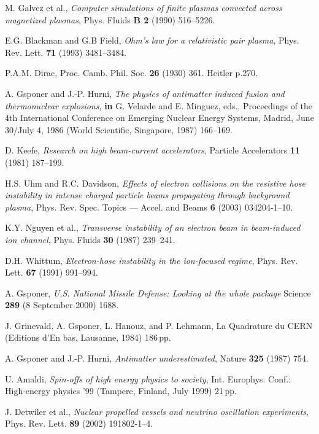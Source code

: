 \documentclass [12pt,a4paper,     ]{report} %
\begin{document}
\begin{enumerate}
 M. Galvez et al.,  \emph{Computer simulations of finite plasmas convected across magnetized plasmas}, Phys. Fluids {\bf B 2} (1990) 516--5226.

 E.G. Blackman and G.B Field, \emph{Ohm's law for a relativistic pair plasma}, Phys. Rev. Lett. {\bf 71} (1993) 3481--3484.

 P.A.M. Dirac, Proc. Camb. Phil. Soc. {\bf 26} (1930) 361. 
Heitler p.270.

  A. Gsponer and J.-P. Hurni, \emph{The physics  of  antimatter induced fusion and thermonuclear explosions}, {\bf in} G. Velarde and E. Minguez, eds., Proceedings of the 4th International  Conference on Emerging Nuclear Energy Systems, Madrid, June 30/July 4, 1986 (World Scientific, Singapore, 1987) 166--169. 



 D. Keefe, \emph{Research on high beam-current accelerators}, Particle Accelerators {\bf 11} (1981) 187--199.

 H.S. Uhm and R.C. Davidson, \emph{Effects of electron collisions on the resistive hose instability in intense charged particle beams propagating through background plasma}, Phys. Rev. Spec. Topics --- Accel. and Beams {\bf 6} (2003) 034204-1--10.

 K.Y. Nguyen et al., \emph{Transverse instability of an electron beam in beam-induced ion channel}, Phys. Fluids {\bf 30} (1987) 239--241.

 D.H. Whittum, \emph{Electron-hose instability in the ion-focused regime}, Phys. Rev. Lett. {\bf 67} (1991) 991--994.

  A. Gsponer, \emph{U.S. National Missile Defense: Looking at the whole package} Science {\bf 289} (8 September 2000) 1688.

 J. Grinevald, A. Gsponer, L. Hanouz, and P. Lehmann, La Quadrature du CERN (Editions d'En bas, Lausanne, 1984) 186\,pp.

  A. Gsponer and J.-P. Hurni, \emph{Antimatter underestimated}, Nature {\bf 325}  (1987) 754.

 U. Amaldi, \emph{Spin-offs of high energy physics to society}, Int. Europhys. Conf.: High-energy physics '99 (Tampere, Finland, July 1999) 21\,pp.

 J. Detwiler et al., \emph{Nuclear propelled vessels and neutrino oscillation experiments}, Phys. Rev. Lett. {\bf 89} (2002) 191802-1--4.


\end{enumerate}
\end{document}
